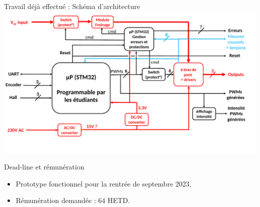 \documentclass[aspectratio=169]{beamer}
\begin{document}
\begin{frame}{Travail déjà effectué : Schéma d'architecture}
\includegraphics[width=\linewidth]{figures/Schema_architecture.pdf} 
\end{frame}

\begin{frame}{Dead-line et rémunération}
\begin{itemize}
	\item Prototype fonctionnel pour la rentrée de septembre 2023,
	\item Rémunération demandée : 64 HETD.
\end{itemize}

\end{frame}
\end{document}
